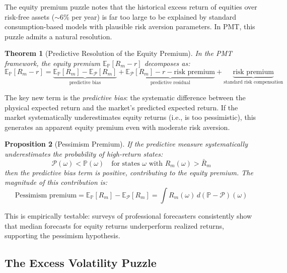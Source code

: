 \documentclass[12pt,a4paper]{article}
\newtheorem{theorem}{Theorem}[section]
\newtheorem{proposition}[theorem]{Proposition}
\theoremstyle{definition}
\newcommand{\E}{\mathbb{E}}
\newcommand{\Prob}{\mathbb{P}}
\newcommand{\PP}{\mathcal{P}}
\begin{document}
The equity premium puzzle \citep{mehra1985} notes that the historical excess return of equities over risk-free assets ($\sim$6\% per year) is far too large to be explained by standard consumption-based models with plausible risk aversion parameters. In PMT, this puzzle admits a natural resolution.

\begin{theorem}[Predictive Resolution of the Equity Premium]\label{thm:equity_premium}
In the PMT framework, the equity premium $\E_\Prob[R_m - r]$ decomposes as:
\begin{equation}\label{eq:equity_premium_decomp}
    \E_\Prob[R_m - r] = \underbrace{\E_\Prob[R_m] - \E_\PP[R_m]}_{\text{predictive bias}} + \underbrace{\E_\PP[R_m] - r - \text{risk premium}}_{\text{predictive residual}} + \underbrace{\text{risk premium}}_{\text{standard risk compensation}}
\end{equation}
\end{theorem}

The key new term is the \emph{predictive bias}: the systematic difference between the physical expected return and the market's predicted expected return. If the market systematically underestimates equity returns (i.e., is too pessimistic), this generates an apparent equity premium even with moderate risk aversion.

\begin{proposition}[Pessimism Premium]\label{prop:pessimism}
If the predictive measure systematically underestimates the probability of high-return states:
\begin{equation}
    \PP(\omega) < \Prob(\omega) \quad \text{for states } \omega \text{ with } R_m(\omega) > \bar{R}_m
\end{equation}
then the predictive bias term is positive, contributing to the equity premium. The magnitude of this contribution is:
\begin{equation}
    \text{Pessimism premium} = \E_\Prob[R_m] - \E_\PP[R_m] = \int R_m(\omega) \, d(\Prob - \PP)(\omega)
\end{equation}
\end{proposition}

This is empirically testable: surveys of professional forecasters consistently show that median forecasts for equity returns underperform realized returns, supporting the pessimism hypothesis.

\subsection{The Excess Volatility Puzzle}
\end{document}
